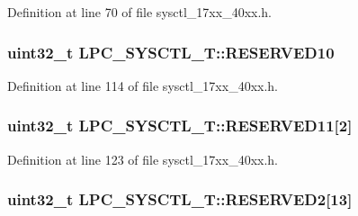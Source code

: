 Definition at line 70 of file sysctl\+\_\+17xx\+\_\+40xx.\+h.

\subsubsection[{\texorpdfstring{R\+E\+S\+E\+R\+V\+E\+D10}{RESERVED10}}]{\setlength{\rightskip}{0pt plus 5cm}uint32\+\_\+t L\+P\+C\+\_\+\+S\+Y\+S\+C\+T\+L\+\_\+\+T\+::\+R\+E\+S\+E\+R\+V\+E\+D10}\hypertarget{structLPC__SYSCTL__T_a98f4753990deb2f55da89740b07b0c71}{}\label{structLPC__SYSCTL__T_a98f4753990deb2f55da89740b07b0c71}


Definition at line 114 of file sysctl\+\_\+17xx\+\_\+40xx.\+h.

\subsubsection[{\texorpdfstring{R\+E\+S\+E\+R\+V\+E\+D11}{RESERVED11}}]{\setlength{\rightskip}{0pt plus 5cm}uint32\+\_\+t L\+P\+C\+\_\+\+S\+Y\+S\+C\+T\+L\+\_\+\+T\+::\+R\+E\+S\+E\+R\+V\+E\+D11\mbox{[}2\mbox{]}}\hypertarget{structLPC__SYSCTL__T_a48f144f097b79ab5a32878b62eb34c1b}{}\label{structLPC__SYSCTL__T_a48f144f097b79ab5a32878b62eb34c1b}


Definition at line 123 of file sysctl\+\_\+17xx\+\_\+40xx.\+h.

\subsubsection[{\texorpdfstring{R\+E\+S\+E\+R\+V\+E\+D2}{RESERVED2}}]{\setlength{\rightskip}{0pt plus 5cm}uint32\+\_\+t L\+P\+C\+\_\+\+S\+Y\+S\+C\+T\+L\+\_\+\+T\+::\+R\+E\+S\+E\+R\+V\+E\+D2\mbox{[}13\mbox{]}}\hypertarget{structLPC__SYSCTL__T_a2832f1458683513b2c4c017670c2193c}{}\label{structLPC__SYSCTL__T_a2832f1458683513b2c4c017670c2193c}


